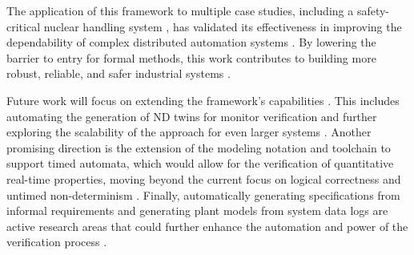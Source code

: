 The application of this framework to multiple case studies, including a safety-critical nuclear handling system \cite{Marchietal.2020}, has validated its effectiveness in improving the dependability of complex distributed automation systems \cite{xavier2023formal}. By lowering the barrier to entry for formal methods, this work contributes to building more robust, reliable, and safer industrial systems \cite{clarke1999}.

Future work will focus on extending the framework's capabilities \cite{xavier2022interactive}. This includes automating the generation of ND twins for monitor verification and further exploring the scalability of the approach for even larger systems \cite{xavier2022plant}. Another promising direction is the extension of the modeling notation and toolchain to support timed automata, which would allow for the verification of quantitative real-time properties, moving beyond the current focus on logical correctness and untimed non-determinism \cite{Time-AwareComputations1}. Finally, automatically generating specifications from informal requirements and generating plant models from system data logs are active research areas that could further enhance the automation and power of the verification process \cite{xavier2022process}.
